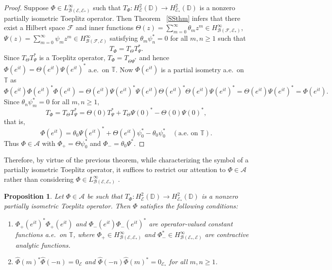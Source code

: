 \documentclass[12pt]{amsart}
\newcommand{\cla}{\mathcal{A}}
\newcommand{\clb}{\mathcal{B}}
\newcommand{\cle}{\mathcal{E}}
\newcommand{\clf}{\mathcal{F}}
\newcommand{\D}{\mathbb{D}}
\newcommand{\T}{\mathbb{T}}
\theoremstyle{definition}
\theoremstyle{plain}
\newtheorem{prop}[thm]{Proposition}
\theoremstyle{definition}
\numberwithin{equation}{section}
\begin{document}
\begin{proof}
Suppose $\Phi \in L^\infty_{\clb(\cle,\cle_*)}$ such that $T_\Phi: H^2_\cle(\D) \rightarrow H^2_{\cle_*}(\D)$ is a nonzero partially isometric Toeplitz operator. Then Theorem~ \ref{SSthm} infers that there exist a Hilbert space 
	$\clf$ and inner functions $\Theta(z)=\sum\limits_{m=0}^\infty \theta_mz^m\in H^\infty_{\clb(\clf,\cle_*)}$, $\Psi(z)=\sum\limits_{m=0}^\infty \psi_m z^m\in H^\infty_{\clb(\clf,\cle)}$ satisfying $\theta_m\psi_n^*=0$ for all $m,n \geq 1$ such that 
	\[
	T_\Phi=T_{\Theta}T_{\Psi}^*.
	\]
	Since $T_\Theta T_\Psi^*$ is a Toeplitz operator, $T_\Phi=T_{\Theta {\Psi}^*}$ and hence $\Phi(e^{it})=\Theta(e^{it})\Psi(e^{it})^*$ a.e.\ on $\T$. Now $\Phi(e^{it})$ is a partial isometry a.e.\ on $\T$ as
	\[
	\Phi(e^{it})\Phi(e^{it})^*\Phi(e^{it})= \Theta(e^{it})\Psi(e^{it})^* \Psi(e^{it}) \Theta(e^{it})^*\Theta(e^{it})\Psi(e^{it})^* = \Theta(e^{it})\Psi(e^{it})^* = \Phi(e^{it}).
	\]
	Since $\theta_n \psi_m^*=0$ for all $m,n\geq 1$, 
	\begin{equation*}
		T_\Phi=T_\Theta T_\Psi^*=\Theta(0)T_{\Psi}^*+ T_\Theta \Psi(0)^*-\Theta(0)\Psi(0)^*,
	\end{equation*}
	that is,
	\begin{equation}\label{eq 5}
		\Phi(e^{it})=\theta_0 \Psi(e^{it})^*+\Theta(e^{it}) \psi_0^*-\theta_0\psi_0^* \quad (\text{a.e.\ on }\T).
	\end{equation}
	Thus $\Phi \in \cla$ with $\Phi_+=\Theta\psi_0^*$ and $\Phi_-=\theta_0\Psi^*$.
\end{proof}

Therefore, by virtue of the previous theorem, while characterizing the symbol of a partially isometric Toeplitz operator, it suffices to  restrict our attention to $\Phi \in \cla$ rather than considering $\Phi \in L^\infty_{\clb(\cle,\cle_*)}$ .

\begin{prop}\label{NC}
Let $\Phi \in \cla$ be such that $T_\Phi: H^2_\cle(\D) \rightarrow H^2_{\cle_*}(\D)$ is a nonzero partially isometric Toeplitz operator. Then $\Phi$ satisfies the following conditions:
\begin{enumerate}
\item  $\Phi_+(e^{it})^*\Phi_+(e^{it}) $ and $\Phi_-(e^{it})\Phi_-(e^{it})^*$
 are  operator-valued constant functions a.e.\ on $\T$, where $\Phi_+ \in H^\infty_{\clb(\cle,\cle_*)}$ and $\Phi_-^* \in H^\infty_{\clb(\cle_*,\cle)}$ are contractive analytic functions. \label{con1} 
\item $\hat{\Phi}(m)^*\hat{\Phi}(-n)=0_\cle$ and $\hat{\Phi}(-n)\hat{\Phi}(m)^*=0_{\cle_*}$ for all $m,n \geq 1$.
\label{con2}
\end{enumerate}
\end{prop}
\end{document}
